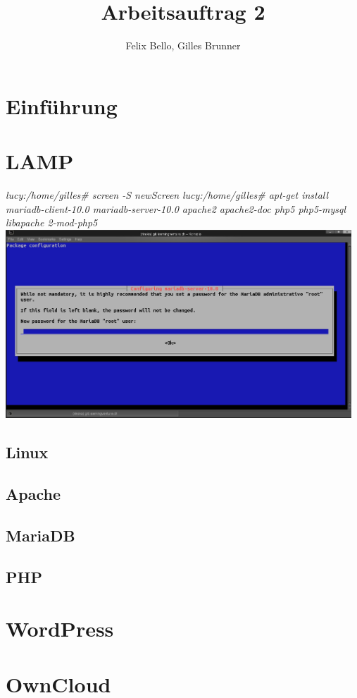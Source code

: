\documentclass{article}
\author{Felix Bello, Gilles Brunner}
\title{Arbeitsauftrag 2}
\begin{document}
	\maketitle
	\section{Einführung}
	\section{LAMP}
	\textit{lucy:/home/gilles\# screen -S newScreen}
	\newline
	\textit{lucy:/home/gilles\# apt-get install mariadb-client-10.0 mariadb-server-10.0 apache2 apache2-doc php5 php5-mysql libapache 2-mod-php5}
	\newline
	\includegraphics[width=13cm]{../Pics/3-lamp-stack-mariadb}
	\subsection{Linux}
	\subsection{Apache}
	\subsection{MariaDB}
	\subsection{PHP}
	\section{WordPress}
	\section{OwnCloud}
\end{document}
